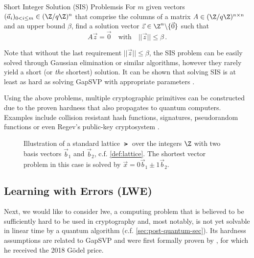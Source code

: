 \begin{definition}{Short Integer Solution (SIS) Problem}{sis}
  For $m$ given vectors $(\vec{a}_i)_{0 < i \leq m} \in (\Z / q\Z)^n$ that comprise the columns of a matrix
  $A \in (\Z / q\Z)^{n \times n}$ and an upper bound $\beta$, find
  a solution vector $\vec{z} \in \Z^n \backslash \{\vec{0}\}$ such that
  $$A \vec{z} = \vec{0} \quad \mathrm{with} \quad ||\vec{z}|| \leq \beta\,.$$
\end{definition}

Note that without the last requirement $||\vec{z}|| \leq \beta$, the SIS problem can be easily solved through Gaussian elimination or similar algorithms, however they rarely yield a short (or \textit{the} shortest) solution.
It can be shown that solving SIS is at least as hard as solving GapSVP with appropriate parameters \parencite{1996-hard-lattice-problems}.

Using the above problems, multiple cryptographic primitives can be constructed due to the proven hardness that also propagates to quantum computers.
Examples include collision resistant hash functions, signatures, pseudorandom functions or even Regev's public-key cryptosystem \parencite{2016-decade-of-lattice}.

\begin{figure}
  \centering
  \caption{Illustration of a standard lattice $\lat$ over the integers $\Z$
    with two basis vectors $\vec{b}_1$ and $\vec{b}_2$, c.f. \autoref{def:lattice}.
    The shortest vector problem in this case is solved by $\vec{x} = 0 \vec{b}_1 \pm 1 \vec{b}_2$.}
  \label{fig:lattice}
\end{figure}

\subsection{Learning with Errors (LWE)}
\label{subsec:lwe}
Next, we would like to consider \Gls{lwe}, a computing problem that is believed to be sufficiently hard to be used in cryptography and, most notably, is not yet solvable in linear time by a quantum algorithm (c.f. \autoref{sec:post-quantum-sec}).
Its hardness assumptions are related to GapSVP and were first formally proven by \citeauthor{2005-lwe-original}, for which he received the 2018 Gödel price.

